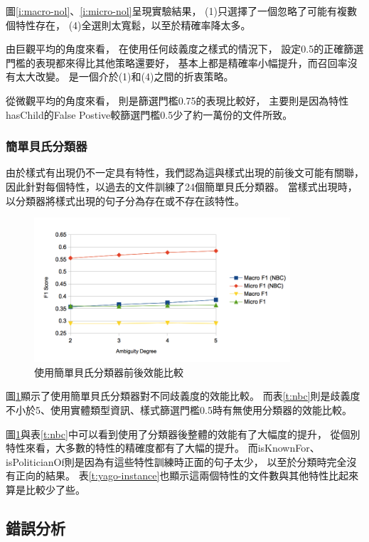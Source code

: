 圖\ref{i:macro-nol}、\ref{i:micro-nol}呈現實驗結果，
(1)只選擇了一個忽略了可能有複數個特性存在，
(4)全選則太寬鬆，以至於精確率降太多。

由巨觀平均的角度來看，
在使用任何歧義度之樣式的情況下，
設定0.5的正確篩選門檻的表現都來得比其他策略還要好，
基本上都是精確率小幅提升，而召回率沒有太大改變。
是一個介於(1)和(4)之間的折衷策略。

從微觀平均的角度來看，
則是篩選門檻0.75的表現比較好，
主要則是因為特性hasChild的False Postive較篩選門檻0.5少了約一萬份的文件所致。

\subsubsection{簡單貝氏分類器}
由於樣式有出現仍不一定具有特性，我們認為這與樣式出現的前後文可能有關聯，
因此針對每個特性，以過去的文件訓練了24個簡單貝氏分類器。
當樣式出現時，以分類器將樣式出現的句子分為存在或不存在該特性。

\begin{figure}[h]
    \centering
    \includegraphics[width=0.85\textwidth]{images/04-nbc}
    \caption{使用簡單貝氏分類器前後效能比較}
    \label{i:nbc}
\end{figure}



圖\ref{i:nbc}顯示了使用簡單貝氏分類器對不同歧義度的效能比較。
而表\ref{t:nbc}則是歧義度不小於5、使用實體類型資訊、樣式篩選門檻0.5時有無使用分類器的效能比較。

圖\ref{i:nbc}與表\ref{t:nbc}中可以看到使用了分類器後整體的效能有了大幅度的提升，
從個別特性來看，大多數的特性的精確度都有了大幅的提升。
而isKnownFor、isPoliticianOf則是因為有這些特性訓練時正面的句子太少，
以至於分類時完全沒有正向的結果。
表\ref{t:yago-instance}也顯示這兩個特性的文件數與其他特性比起來算是比較少了些。

\subsection{錯誤分析}

